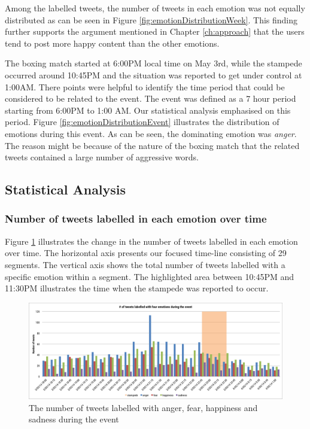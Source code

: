 Among the labelled tweets, the number of tweets in each emotion was not equally distributed as can be seen in Figure \ref{fig:emotionDistributionWeek}. This finding further supports the argument mentioned in Chapter \ref{ch:approach} that the users tend to post more happy content than the other emotions. 

The boxing match started at 6:00PM local time on May 3rd, while the stampede occurred around 10:45PM and the situation was reported to get under control at 1:00AM. There points were helpful to identify the time period that could be considered to be related to the event. The event was defined as a 7 hour period starting from 6:00PM to 1:00 AM. Our statistical analysis emphasised on this period. Figure \ref{fig:emotionDistributionEvent} illustrates the distribution of emotions during this event. As can be seen, the dominating emotion was \textit{anger}. The reason might be because of the nature of the boxing match that the related tweets contained a large number of aggressive words.

\subsection{Statistical Analysis}

\subsubsection{Number of tweets labelled in each emotion over time}
Figure \ref{fig:emotionInstanceEvent} illustrates the change in the number of tweets labelled in each emotion over time. The horizontal axis presents our focused time-line consisting of 29 segments. The vertical axis shows the total number of tweets labelled with a specific emotion within a segment. The highlighted area between 10:45PM and 11:30PM illustrates the time when the stampede was reported to occur.

\begin{figure}[!htbp] 
\centering
\includegraphics[width=1.0\linewidth]{EmotionInstanceEvent}
\caption{The number of tweets labelled with anger, fear, happiness and sadness during the event}
\label{fig:emotionInstanceEvent}
\end{figure}

